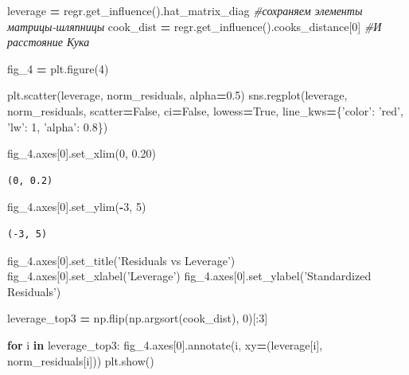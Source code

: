 \documentclass[]{book}
\newenvironment{Shaded}{\begin{snugshade}}{\end{snugshade}}
\newcommand{\CommentTok}[1]{\textcolor[rgb]{0.56,0.35,0.01}{\textit{#1}}}
\newcommand{\ControlFlowTok}[1]{\textcolor[rgb]{0.13,0.29,0.53}{\textbf{#1}}}
\newcommand{\DecValTok}[1]{\textcolor[rgb]{0.00,0.00,0.81}{#1}}
\newcommand{\FloatTok}[1]{\textcolor[rgb]{0.00,0.00,0.81}{#1}}
\newcommand{\KeywordTok}[1]{\textcolor[rgb]{0.13,0.29,0.53}{\textbf{#1}}}
\newcommand{\NormalTok}[1]{#1}
\newcommand{\OperatorTok}[1]{\textcolor[rgb]{0.81,0.36,0.00}{\textbf{#1}}}
\newcommand{\StringTok}[1]{\textcolor[rgb]{0.31,0.60,0.02}{#1}}
\newcommand{\VariableTok}[1]{\textcolor[rgb]{0.00,0.00,0.00}{#1}}
\begin{document}
\begin{Shaded}
\begin{Highlighting}[]
\NormalTok{leverage }\OperatorTok{=}\NormalTok{ regr.get_influence().hat_matrix_diag }\CommentTok{#сохраняем элементы матрицы-шляпницы}
\NormalTok{cook_dist }\OperatorTok{=}\NormalTok{ regr.get_influence().cooks_distance[}\DecValTok{0}\NormalTok{] }\CommentTok{#И расстояние Кука}

\NormalTok{fig_4 }\OperatorTok{=}\NormalTok{ plt.figure(}\DecValTok{4}\NormalTok{)}

\NormalTok{plt.scatter(leverage, norm_residuals, alpha}\OperatorTok{=}\FloatTok{0.5}\NormalTok{)}
\NormalTok{sns.regplot(leverage, norm_residuals, }
\NormalTok{            scatter}\OperatorTok{=}\VariableTok{False}\NormalTok{, }
\NormalTok{            ci}\OperatorTok{=}\VariableTok{False}\NormalTok{, }
\NormalTok{            lowess}\OperatorTok{=}\VariableTok{True}\NormalTok{,}
\NormalTok{            line_kws}\OperatorTok{=}\NormalTok{\{}\StringTok{'color'}\NormalTok{: }\StringTok{'red'}\NormalTok{, }\StringTok{'lw'}\NormalTok{: }\DecValTok{1}\NormalTok{, }\StringTok{'alpha'}\NormalTok{: }\FloatTok{0.8}\NormalTok{\})}

\NormalTok{fig_4.axes[}\DecValTok{0}\NormalTok{].set_xlim(}\DecValTok{0}\NormalTok{, }\FloatTok{0.20}\NormalTok{)}
\end{Highlighting}
\end{Shaded}

\begin{verbatim}
(0, 0.2)
\end{verbatim}

\begin{Shaded}
\begin{Highlighting}[]
\NormalTok{fig_4.axes[}\DecValTok{0}\NormalTok{].set_ylim(}\OperatorTok{-}\DecValTok{3}\NormalTok{, }\DecValTok{5}\NormalTok{)}
\end{Highlighting}
\end{Shaded}

\begin{verbatim}
(-3, 5)
\end{verbatim}

\begin{Shaded}
\begin{Highlighting}[]
\NormalTok{fig_4.axes[}\DecValTok{0}\NormalTok{].set_title(}\StringTok{'Residuals vs Leverage'}\NormalTok{)}
\NormalTok{fig_4.axes[}\DecValTok{0}\NormalTok{].set_xlabel(}\StringTok{'Leverage'}\NormalTok{)}
\NormalTok{fig_4.axes[}\DecValTok{0}\NormalTok{].set_ylabel(}\StringTok{'Standardized Residuals'}\NormalTok{)}


\NormalTok{leverage_top3 }\OperatorTok{=}\NormalTok{ np.flip(np.argsort(cook_dist), }\DecValTok{0}\NormalTok{)[:}\DecValTok{3}\NormalTok{]}

\ControlFlowTok{for}\NormalTok{ i }\KeywordTok{in}\NormalTok{ leverage_top3:}
\NormalTok{    fig_4.axes[}\DecValTok{0}\NormalTok{].annotate(i, }
\NormalTok{                               xy}\OperatorTok{=}\NormalTok{(leverage[i], }
\NormalTok{                                   norm_residuals[i]))}
\NormalTok{plt.show()}
\end{Highlighting}
\end{Shaded}
\end{document}
